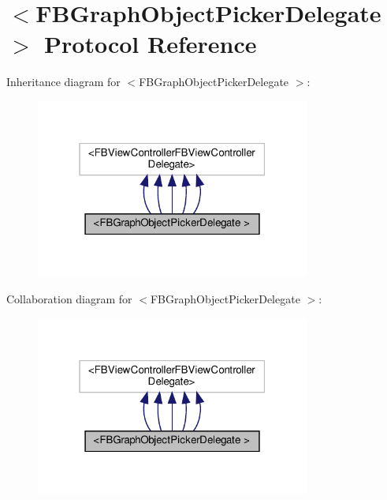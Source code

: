 \hypertarget{protocolFBGraphObjectPickerDelegate_01-p}{}\section{$<$F\+B\+Graph\+Object\+Picker\+Delegate $>$ Protocol Reference}
\label{protocolFBGraphObjectPickerDelegate_01-p}


Inheritance diagram for $<$F\+B\+Graph\+Object\+Picker\+Delegate $>$\+:
\nopagebreak
\begin{figure}[H]
\begin{center}
\leavevmode
\includegraphics[width=256pt]{protocolFBGraphObjectPickerDelegate_01-p__inherit__graph}
\end{center}
\end{figure}


Collaboration diagram for $<$F\+B\+Graph\+Object\+Picker\+Delegate $>$\+:
\nopagebreak
\begin{figure}[H]
\begin{center}
\leavevmode
\includegraphics[width=256pt]{protocolFBGraphObjectPickerDelegate_01-p__coll__graph}
\end{center}
\end{figure}
